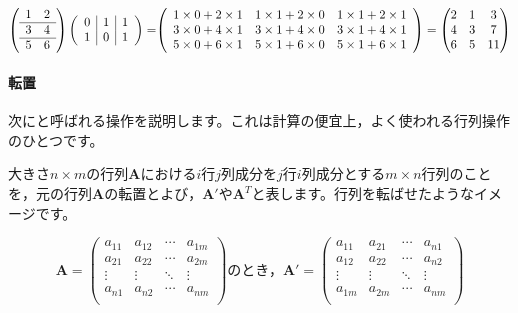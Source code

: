 \documentclass{ltjsbook}
\begin{document}
\begin{equation*}
	\left(
	\begin{array}{cc}
		1 & 2 \\\hline
		3 & 4 \\\hline
		5 & 6 \\
	\end{array}
	\right)
	\left(
	\begin{array}{c|c|c}
		0 & 1 & 1 \\
		1 & 0 & 1
	\end{array}
	\right)
	=
	$$
	$$
	\left(
	\begin{array}{ccc}
		1 \times 0 + 2 \times 1 & 1 \times 1 + 2 \times 0 & 1 \times 1+2\times 1 \\
		3 \times 0 + 4 \times 1 & 3 \times 1 + 4 \times 0 & 3 \times 1+4\times 1 \\
		5 \times 0 + 6 \times 1 & 5 \times 1 + 6 \times 0 & 5 \times 1+6\times 1 \\
	\end{array}
	\right)
	=
	\begin{pmatrix}
		2 & 1 & 3  \\
		4 & 3 & 7  \\
		6 & 5 & 11
	\end{pmatrix}
\end{equation*}


\paragraph{転置}
次にと呼ばれる操作を説明します。これは計算の便宜上，よく使われる行列操作のひとつです。

大きさ$n \times m$の行列$\bm{A}$における$i$行$j$列成分を$j$行$i$列成分とする$m \times n$行列のことを，元の行列$\bm{A}$の転置とよび，$\bm{A}'$や$\bm{A}^T$と表します。行列を転ばせたようなイメージです。

\begin{equation*}
	\bm{A}=
	\begin{pmatrix}
		a_{11} & a_{12} & \cdots & a_{1m} \\
		a_{21} & a_{22} & \cdots & a_{2m} \\
		\vdots & \vdots & \ddots & \vdots \\
		a_{n1} & a_{n2} & \cdots & a_{nm} \\
	\end{pmatrix}
	\mbox{のとき，}
	\bm{A}'=
	\begin{pmatrix}
		a_{11} & a_{21} & \cdots & a_{n1} \\
		a_{12} & a_{22} & \cdots & a_{n2} \\
		\vdots & \vdots & \ddots & \vdots \\
		a_{1m} & a_{2m} & \cdots & a_{nm} \\
	\end{pmatrix}
\end{equation*}
\end{document}
